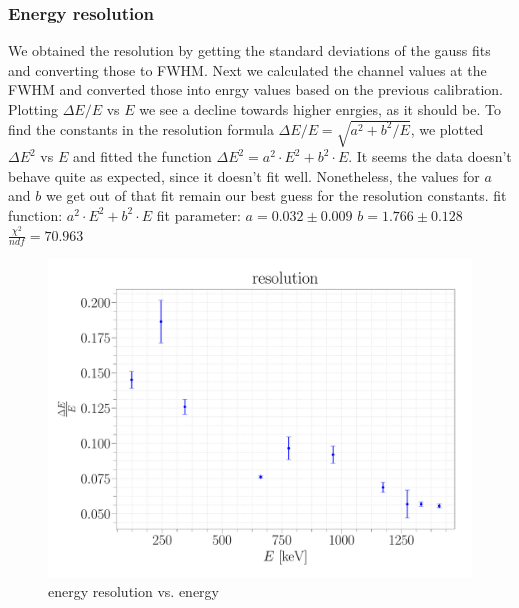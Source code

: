 \documentclass[a4paper,12pt]{article}
\begin{document}
\subsubsection{Energy resolution}
We obtained the resolution by getting the standard deviations of the gauss fits and converting those to FWHM. Next we calculated the channel values at the FWHM and converted those into enrgy values based on the previous calibration. Plotting $\Delta E/E$ vs $E$ we see a decline towards higher enrgies, as it should be.
To find the constants in the resolution formula $\Delta E/E = \sqrt{a^2+b^2/E}$, we plotted $\Delta E^2$ vs $E$ and fitted the function $\Delta E^2 = a^2 \cdot E^2 + b^2 \cdot E$.
It seems the data doesn't behave quite as expected, since it doesn't fit well. Nonetheless, the values for $a$ and $b$ we get out of that fit remain our best guess for the resolution constants.\newline
fit function: \newline
$a^2 \cdot E^2 + b^2 \cdot E$ \newline
fit parameter: \newline
$a = 0.032\pm0.009$ \newline
$b = 1.766\pm0.128$ \newline
$\frac{\chi^2}{ndf} = 70.963$ \newline

\begin{figure}
\center
\includegraphics[scale=0.3]{../Figures/resolution.pdf}
\caption{energy resolution vs. energy}
\label{resolution}
\end{figure}
\newpage
\end{document}
